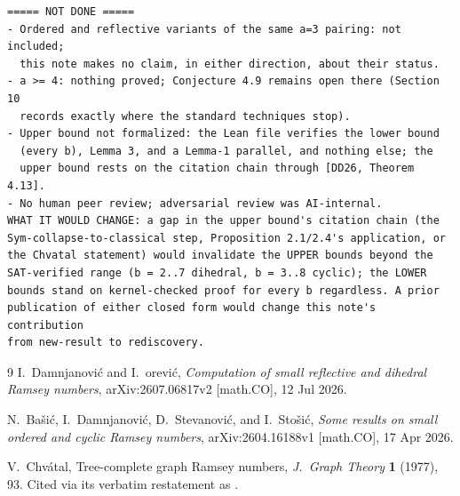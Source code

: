 \documentclass[11pt]{article}
\theoremstyle{definition}
\begin{document}
\medskip
{\small
\begin{verbatim}
===== NOT DONE =====
- Ordered and reflective variants of the same a=3 pairing: not included;
  this note makes no claim, in either direction, about their status.
- a >= 4: nothing proved; Conjecture 4.9 remains open there (Section 10
  records exactly where the standard techniques stop).
- Upper bound not formalized: the Lean file verifies the lower bound
  (every b), Lemma 3, and a Lemma-1 parallel, and nothing else; the
  upper bound rests on the citation chain through [DD26, Theorem 4.13].
- No human peer review; adversarial review was AI-internal.
WHAT IT WOULD CHANGE: a gap in the upper bound's citation chain (the
Sym-collapse-to-classical step, Proposition 2.1/2.4's application, or
the Chvatal statement) would invalidate the UPPER bounds beyond the
SAT-verified range (b = 2..7 dihedral, b = 3..8 cyclic); the LOWER
bounds stand on kernel-checked proof for every b regardless. A prior
publication of either closed form would change this note's contribution
from new-result to rediscovery.
\end{verbatim}
}

\begin{thebibliography}{9}
I.~Damnjanovi\'c and I.~\DJ{}or\dj{}evi\'c,
\emph{Computation of small reflective and dihedral Ramsey numbers},
arXiv:2607.06817v2 [math.CO], 12 Jul 2026.

N.~Ba\v{s}i\'c, I.~Damnjanovi\'c, D.~Stevanovi\'c, and I.~Sto\v{s}i\'c,
\emph{Some results on small ordered and cyclic Ramsey numbers},
arXiv:2604.16188v1 [math.CO], 17 Apr 2026.

V.~Chv\'atal,
Tree-complete graph Ramsey numbers,
\emph{J.~Graph Theory} \textbf{1} (1977), 93.
Cited via its verbatim restatement as \cite[Theorem~4.13]{DD26}.
\end{thebibliography}
\end{document}
